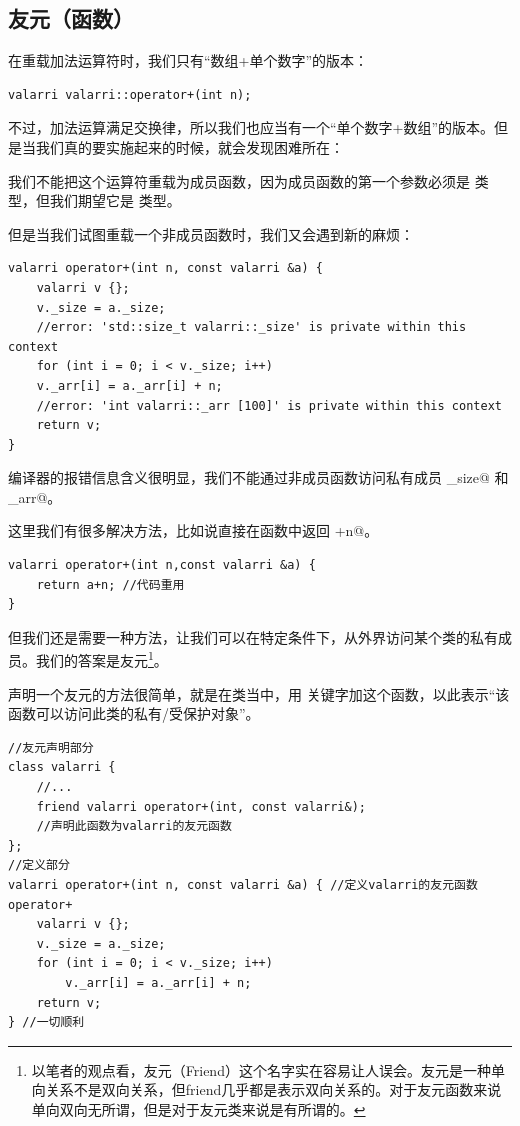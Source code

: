 \subsection*{友元（函数）}
在重载加法运算符时，我们只有``数组+单个数字''的版本：
\begin{lstlisting}
valarri valarri::operator+(int n);
\end{lstlisting}
不过，加法运算满足交换律，所以我们也应当有一个``单个数字+数组''的版本。但是当我们真的要实施起来的时候，就会发现困难所在：\par
我们不能把这个运算符重载为成员函数，因为成员函数的第一个参数必须是 \lstinline@valarri@ 类型，但我们期望它是 \lstinline@int@ 类型。\par
但是当我们试图重载一个非成员函数时，我们又会遇到新的麻烦：
\begin{lstlisting}
valarri operator+(int n, const valarri &a) {
    valarri v {};
    v._size = a._size;
    //error: 'std::size_t valarri::_size' is private within this context
    for (int i = 0; i < v._size; i++)
    v._arr[i] = a._arr[i] + n;
    //error: 'int valarri::_arr [100]' is private within this context
    return v;
}
\end{lstlisting}
编译器的报错信息含义很明显，我们不能通过非成员函数访问私有成员 \lstinline@_size@ 和 \lstinline@_arr@。\par
这里我们有很多解决方法，比如说直接在函数中返回 \lstinline@a+n@。
\begin{lstlisting}
valarri operator+(int n,const valarri &a) {
    return a+n; //代码重用
}
\end{lstlisting}\par
但我们还是需要一种方法，让我们可以在特定条件下，从外界访问某个类的私有成员。我们的答案是友元\footnote{以笔者的观点看，友元（Friend）这个名字实在容易让人误会。友元是一种单向关系不是双向关系，但friend几乎都是表示双向关系的。对于友元函数来说单向双向无所谓，但是对于友元类来说是有所谓的。}。\par
声明一个友元的方法很简单，就是在类当中，用 \lstinline@friend@ 关键字加这个函数，以此表示``该函数可以访问此类的私有/受保护对象''。
\begin{lstlisting}
//友元声明部分
class valarri {
    //...
    friend valarri operator+(int, const valarri&);
    //声明此函数为valarri的友元函数
};
//定义部分
valarri operator+(int n, const valarri &a) { //定义valarri的友元函数operator+
    valarri v {};
    v._size = a._size;
    for (int i = 0; i < v._size; i++)
        v._arr[i] = a._arr[i] + n;
    return v;
} //一切顺利
\end{lstlisting}\par
